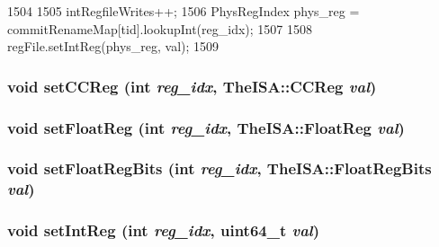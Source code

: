 \begin{DoxyCode}
1504 {
1505     intRegfileWrites++;
1506     PhysRegIndex phys_reg = commitRenameMap[tid].lookupInt(reg_idx);
1507 
1508     regFile.setIntReg(phys_reg, val);
1509 }
\end{DoxyCode}
\hypertarget{classFullO3CPU_ab41bd7f1c28d09676694843602e180b6}{
\subsubsection[{setCCReg}]{\setlength{\rightskip}{0pt plus 5cm}void setCCReg (int {\em reg\_\-idx}, \/  TheISA::CCReg {\em val})}}
\label{classFullO3CPU_ab41bd7f1c28d09676694843602e180b6}
\hypertarget{classFullO3CPU_ab4fbd29dd25664125eb83aa0d1c45a96}{
\subsubsection[{setFloatReg}]{\setlength{\rightskip}{0pt plus 5cm}void setFloatReg (int {\em reg\_\-idx}, \/  TheISA::FloatReg {\em val})}}
\label{classFullO3CPU_ab4fbd29dd25664125eb83aa0d1c45a96}
\hypertarget{classFullO3CPU_ad25b1101e69d1987937252f44c48fb96}{
\subsubsection[{setFloatRegBits}]{\setlength{\rightskip}{0pt plus 5cm}void setFloatRegBits (int {\em reg\_\-idx}, \/  TheISA::FloatRegBits {\em val})}}
\label{classFullO3CPU_ad25b1101e69d1987937252f44c48fb96}
\hypertarget{classFullO3CPU_abc264e8ee37c6bd7d7b5759b97c34356}{
\subsubsection[{setIntReg}]{\setlength{\rightskip}{0pt plus 5cm}void setIntReg (int {\em reg\_\-idx}, \/  uint64\_\-t {\em val})}}
\label{classFullO3CPU_abc264e8ee37c6bd7d7b5759b97c34356}



